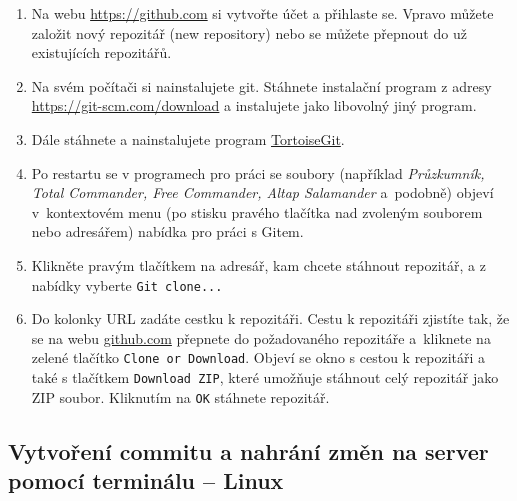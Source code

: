 \begin{enumerate}
	
	\item Na webu \url{https://github.com} si vytvořte účet a přihlaste se. 
	Vpravo můžete založit nový repozitář (new repository) nebo se můžete přepnout do už existujících repozitářů. 
	
	\item Na svém počítači si nainstalujete git. Stáhnete instalační program z adresy 
	\url{https://git-scm.com/download} a instalujete jako libovolný jiný program. 
	
	\item Dále stáhnete a nainstalujete program \href{https://tortoisegit.org/}{TortoiseGit}.
	
	\item Po restartu se v programech pro práci se soubory (například 
	{\it Průzkumník, Total Commander, Free Commander, Altap Salamander} a~podobně) objeví 
	v~kontextovém menu (po stisku pravého tlačítka nad zvoleným souborem nebo adresářem)  
	nabídka pro práci s Gitem. 
	\item Klikněte pravým tlačítkem na adresář, kam chcete stáhnout repozitář, a z nabídky vyberte {\tt Git clone...}  
	\item Do kolonky URL zadáte cestku k repozitáři. Cestu k repozitáři zjistíte tak, 
	že se na webu \url{github.com} přepnete do požadovaného repozitáře a~kliknete na zelené tlačítko {\tt Clone or Download}. 
	Objeví se okno s cestou k repozitáři a také s tlačítkem {\tt Download ZIP}, které umožňuje stáhnout celý repozitář jako ZIP soubor. Kliknutím na {\tt OK} stáhnete repozitář. 
	
	
\end{enumerate}

\subsection{Vytvoření commitu a nahrání změn na server pomocí terminálu -- Linux}

